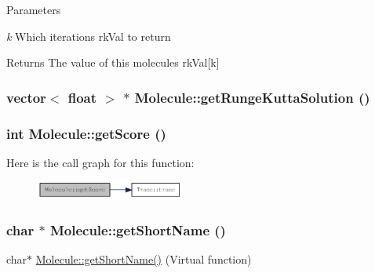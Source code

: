 \begin{DoxyParams}{Parameters}
\item[{\em k}]Which iterations rkVal to return\end{DoxyParams}
\begin{DoxyReturn}{Returns}
The value of this molecules rkVal\mbox{[}k\mbox{]} 
\end{DoxyReturn}
\hypertarget{classMolecule_a4405c3a17adfed340826d8b31e4da589}{
\subsubsection[{getRungeKuttaSolution}]{\setlength{\rightskip}{0pt plus 5cm}vector$<$ float $>$ $\ast$ Molecule::getRungeKuttaSolution ()}}
\label{classMolecule_a4405c3a17adfed340826d8b31e4da589}
\hypertarget{classMolecule_a125243e73faff1e5e482e65ba923ca3a}{
\subsubsection[{getScore}]{\setlength{\rightskip}{0pt plus 5cm}int Molecule::getScore ()}}
\label{classMolecule_a125243e73faff1e5e482e65ba923ca3a}


Here is the call graph for this function:\nopagebreak
\begin{figure}[H]
\begin{center}
\leavevmode
\includegraphics[width=138pt]{classMolecule_a125243e73faff1e5e482e65ba923ca3a_cgraph}
\end{center}
\end{figure}
\hypertarget{classMolecule_a6d8720e89d81c1297beced997ad62718}{
\subsubsection[{getShortName}]{\setlength{\rightskip}{0pt plus 5cm}char $\ast$ Molecule::getShortName ()}}
\label{classMolecule_a6d8720e89d81c1297beced997ad62718}
char$\ast$ \hyperlink{classMolecule_a6d8720e89d81c1297beced997ad62718}{Molecule::getShortName()} (Virtual function)

